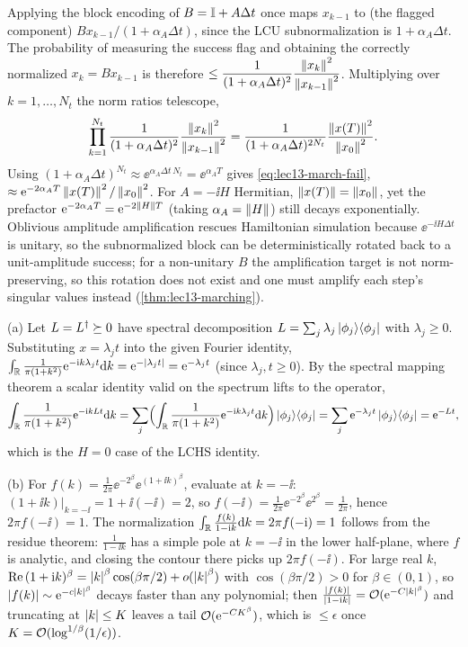 \begin{solution}
Applying the block encoding of $B=\mathbb{I}+A\Delta t$ once maps $x_{k-1}$ to (the flagged component)
$B x_{k-1}/(1+\alpha_A\Delta t)$, since the LCU subnormalization is $1+\alpha_A\Delta t$. The
probability of measuring the success flag and obtaining the correctly normalized $x_k=Bx_{k-1}$
is therefore $\le\dfrac{1}{(1+\alpha_A\Delta t)^2}\dfrac{\left\lVert x_k \right\rVert^2}{\left\lVert x_{k-1} \right\rVert^2}$.
Multiplying over $k=1,\dots,N_t$ the norm ratios telescope,
\[
  \prod_{k=1}^{N_t}\frac{1}{(1+\alpha_A\Delta t)^2}\frac{\left\lVert x_k \right\rVert^2}{\left\lVert x_{k-1} \right\rVert^2}
  =\frac{1}{(1+\alpha_A\Delta t)^{2N_t}}\frac{\left\lVert x(T) \right\rVert^2}{\left\lVert x_0 \right\rVert^2}.
\]
Using $(1+\alpha_A\Delta t)^{N_t}\approx\ee^{\alpha_A\Delta t\,N_t}=\ee^{\alpha_A T}$ gives
\eqref{eq:lec13-march-fail}, $\approx\mathrm{e}^{-2\alpha_A T}\left\lVert x(T) \right\rVert^2/\left\lVert x_0 \right\rVert^2$. For
$A=-\ii H$ Hermitian, $\left\lVert x(T) \right\rVert=\left\lVert x_0 \right\rVert$, yet the prefactor $\mathrm{e}^{-2\alpha_A T}=
\mathrm{e}^{-2\left\lVert H \right\rVert T}$ (taking $\alpha_A=\left\lVert H \right\rVert$) still decays exponentially. Oblivious amplitude
amplification rescues Hamiltonian simulation because $\ee^{-\ii H\Delta t}$ is unitary, so the
subnormalized block can be deterministically rotated back to a unit-amplitude success; for a
non-unitary $B$ the amplification target is not norm-preserving, so this rotation does not exist
and one must amplify each step's singular values instead (\cref{thm:lec13-marching}).
\end{solution}

\begin{solution}
(a) Let $L=L^{\dagger}\succeq0$ have spectral decomposition $L=\sum_j\lambda_j\ket{\phi_j}\!\bra{\phi_j}$ with
$\lambda_j\ge0$. Substituting $x=\lambda_j t$ into the given Fourier identity,
$\int_{\mathbb{R}}\frac{1}{\pi(1+k^2)}\mathrm{e}^{-\mathrm{i} k\lambda_j t}\mathrm{d} k=\mathrm{e}^{-\left\lvert \lambda_j t \right\rvert}=\mathrm{e}^{-\lambda_j t}$
(since $\lambda_j,t\ge0$). By the spectral mapping theorem a scalar identity valid on the
spectrum lifts to the operator,
\[
  \int_{\mathbb{R}}\frac{1}{\pi(1+k^2)}\mathrm{e}^{-\mathrm{i} kLt}\mathrm{d} k
  =\sum_j\Bigl(\int_{\mathbb{R}}\frac{1}{\pi(1+k^2)}\mathrm{e}^{-\mathrm{i} k\lambda_j t}\mathrm{d} k\Bigr)\ket{\phi_j}\!\bra{\phi_j}
  =\sum_j\mathrm{e}^{-\lambda_j t}\ket{\phi_j}\!\bra{\phi_j}=\mathrm{e}^{-Lt},
\]
which is the $H=0$ case of the LCHS identity.

(b) For $f(k)=\frac{1}{2\pi}\ee^{-2^\beta}\ee^{(1+\ii k)^\beta}$, evaluate at $k=-\ii$:
$(1+\ii k)|_{k=-\ii}=1+\ii(-\ii)=2$, so $f(-\ii)=\frac1{2\pi}\ee^{-2^\beta}\ee^{2^\beta}=
\frac1{2\pi}$, hence $2\pi f(-\ii)=1$. The normalization $\int_{\mathbb{R}}\frac{f(k)}{1-\mathrm{i} k}\mathrm{d} k=
2\pi f(-\mathrm{i})=1$ follows from the residue theorem: $\frac{1}{1-\ii k}$ has a simple pole at
$k=-\ii$ in the lower half-plane, where $f$ is analytic, and closing the contour there picks up
$2\pi f(-\ii)$. For large real $k$, $\mathrm{Re}\,(1+\mathrm{i} k)^\beta=\left\lvert k \right\rvert^\beta\cos(\beta\pi/2)
+o(\left\lvert k \right\rvert^\beta)$ with $\cos(\beta\pi/2)>0$ for $\beta\in(0,1)$, so $\left\lvert f(k) \right\rvert\sim
\mathrm{e}^{-c\left\lvert k \right\rvert^\beta}$ decays faster than any polynomial; then $\frac{\left\lvert f(k) \right\rvert}{\left\lvert 1-\mathrm{i} k \right\rvert}
=\mathcal{O}(\mathrm{e}^{-C\left\lvert k \right\rvert^\beta})$ and truncating at $\left\lvert k \right\rvert\le K$ leaves a tail
$\mathcal{O}(\mathrm{e}^{-CK^\beta})$, which is $\le\epsilon$ once $K=\mathcal{O}(\log^{1/\beta}(1/\epsilon))$.
\end{solution}

